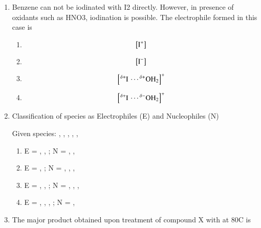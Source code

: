 \documentclass[journal,12pt,onecolumn]{IEEEtran}
\theoremstyle{remark}
\begin{document}
\begin{enumerate}
\begin{multicols}{2}
\begin{enumerate}
\end{enumerate}

\end{multicols}

\item  Benzene can not be iodinated with I2 directly. However, in presence of oxidants such as HNO3, iodination is possible. The electrophile formed in this case is
\hfill{}

\begin{multicols}{4}
   
\begin{enumerate}
   \item   \[
  \left[ \ce{I^+} \right]
  \]
   \item   \[
  \left[ \ce{I^-} \right]
  \]
 \item   \[
  \left[ \ce{^{\delta+}I \cdots ^{\delta+}OH2} \right]^+
  \]

   \item   \[
  \left[ \ce{^{\delta+}I \cdots ^{\delta-}OH2} \right]^+
  \]
 
\end{enumerate}

\end{multicols}

\item Classification of species as Electrophiles (E) and Nucleophiles (N)\hfill{}

Given species: , , , , , 
 


\begin{enumerate}
   
\item  E = , ,  \quad ; \quad N = , ,  \\
\item  E = ,  \quad ; \quad N = , , ,  \\
\item  E = , ,  \quad ; \quad N = , , ,  \\
\item  E = , , ,  \quad ; \quad N = , 
\end{enumerate}

\item The major product obtained upon treatment of compound X with  at 80\degree C is \hfill{}


\end{enumerate}
\end{document}
